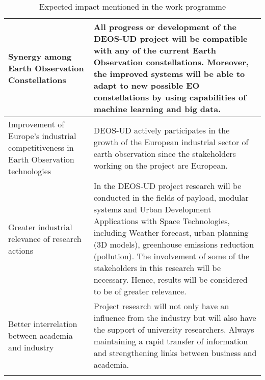 \begin{longtable}[H]{p{6cm} p{8cm}}
		\midrule
		
		Synergy among Earth Observation Constellations & All progress or development of the DEOS-UD project will be compatible with any of the current Earth Observation constellations. Moreover, the improved systems will be able to adapt to new possible EO constellations by using capabilities of machine learning and big data.\vspace{0.2cm}\\
		
		\midrule
		
		Improvement of Europe’s industrial competitiveness in Earth Observation technologies & DEOS-UD actively participates in the growth of the European industrial sector of earth observation since the stakeholders working on the project are European.\vspace{0.2cm}\\
		
		\midrule
		
		Greater industrial relevance of research actions & In the DEOS-UD project research will be conducted in the fields of payload, modular systems and Urban Development Applications with Space Technologies, including Weather forecast, urban planning (3D models), greenhouse emissions reduction (pollution). The involvement of some of the stakeholders in this research will be necessary. Hence, results will be considered to be of greater relevance.\vspace{0.2cm}\\
		
		\midrule
		
		Better interrelation between academia and industry & Project research will not only have an influence from the industry but will also have the support of university researchers. Always maintaining a rapid transfer of information and strengthening links between business and academia.\vspace{0.2cm}\\
		
		
		\bottomrule[2pt]
		

	\caption{Expected impact mentioned in the work programme}
\end{longtable}


